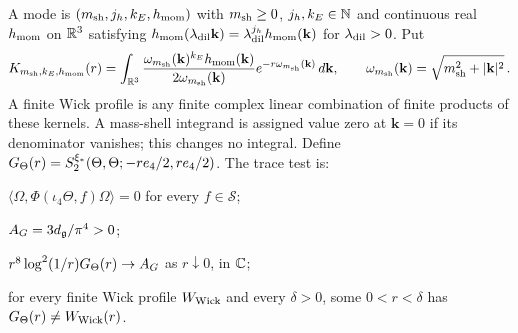 \begin{definition}\label{def:trace-test}
A mode is $(m_{\rm sh},j_h,k_E,h_{\rm mom})$ with $m_{\rm sh}\ge0$, $j_h,k_E\in\mathbb{N}$ and continuous real $h_{\rm mom}$ on $\mathbb{R}^3$ satisfying $h_{\rm mom}(\lambda_{\rm dil}\mathbf k)=\lambda_{\rm dil}^{j_h}h_{\rm mom}(\mathbf k)$ for $\lambda_{\rm dil}>0$. Put
\begin{equation}\label{eq:mode-kernel}
K_{m_{\rm sh},k_E,h_{\rm mom}}(r)=\int_{\mathbb{R}^3}\frac{\omega_{m_{\rm sh}}(\mathbf k)^{k_E}h_{\rm mom}(\mathbf k)}{2\omega_{m_{\rm sh}}(\mathbf k)}e^{-r\omega_{m_{\rm sh}}(\mathbf k)}\,d\mathbf k,\qquad \omega_{m_{\rm sh}}(\mathbf k)=\sqrt{m_{\rm sh}^2+|\mathbf k|^2}\,.
\end{equation}
A finite Wick profile is any finite complex linear combination of finite products of these kernels. A mass-shell integrand is assigned value zero at $\mathbf k=0$ if its denominator vanishes; this changes no integral. Define $G_{\Theta}(r)=S_2^{\xi_*}(\Theta,\Theta;-re_4/2,re_4/2)$. The trace test is:

\begin{description}[font=\normalfont,leftmargin=3.8em,labelindent=0pt,nosep]
\item[T1.] $\langle\Omega,\Phi(\iota_4\Theta,f)\Omega\rangle=0$ for every $f\in\mathcal S$;
\item[T2.] $A_G=3d_{\mathfrak{g}}/\pi^4>0$;
\item[T3.] $r^8\log^2(1/r)G_{\Theta}(r)\to A_G$ as $r\downarrow0$, in $\mathbb{C}$;
\item[T4.] for every finite Wick profile $W_{\rm Wick}$ and every $\delta>0$, some $0<r<\delta$ has $G_{\Theta}(r)\ne W_{\rm Wick}(r)$.
\end{description}
\end{definition}


